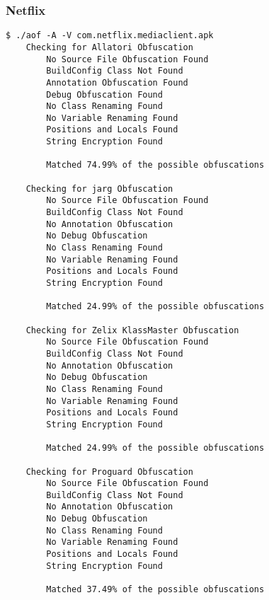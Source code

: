 \subsubsection{Netflix \cite{netflix}}
\label{app:aflix}
\begin{lstlisting}
$ ./aof -A -V com.netflix.mediaclient.apk
    Checking for Allatori Obfuscation
        No Source File Obfuscation Found
        BuildConfig Class Not Found
        Annotation Obfuscation Found
        Debug Obfuscation Found
        No Class Renaming Found
        No Variable Renaming Found
        Positions and Locals Found
        String Encryption Found

        Matched 74.99% of the possible obfuscations

    Checking for jarg Obfuscation
        No Source File Obfuscation Found
        BuildConfig Class Not Found
        No Annotation Obfuscation
        No Debug Obfuscation
        No Class Renaming Found
        No Variable Renaming Found
        Positions and Locals Found
        String Encryption Found

        Matched 24.99% of the possible obfuscations

    Checking for Zelix KlassMaster Obfuscation
        No Source File Obfuscation Found
        BuildConfig Class Not Found
        No Annotation Obfuscation
        No Debug Obfuscation
        No Class Renaming Found
        No Variable Renaming Found
        Positions and Locals Found
        String Encryption Found

        Matched 24.99% of the possible obfuscations

    Checking for Proguard Obfuscation
        No Source File Obfuscation Found
        BuildConfig Class Not Found
        No Annotation Obfuscation
        No Debug Obfuscation
        No Class Renaming Found
        No Variable Renaming Found
        Positions and Locals Found
        String Encryption Found

        Matched 37.49% of the possible obfuscations
\end{lstlisting}
\newpage
